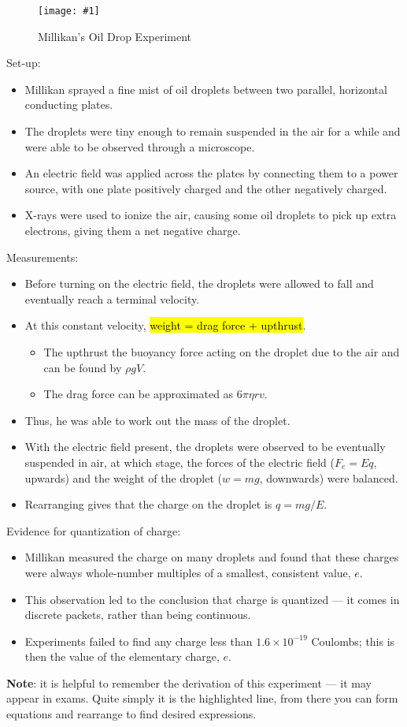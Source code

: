 \documentclass[a4paper,12pt]{article}
\newcommand{\img}[4]{\begin{center}
  \begin{figure}[H]
    \centering
    \texttt{[image: \#1]}
    \caption{#3}
    \label{fig:#4}
  \end{figure}
\end{center}}
\begin{document}
\img{oildrop.jpg}{0.7}{Millikan's Oil Drop Experiment}{oildrop}
Set-up:
\begin{itemize}
  \item Millikan sprayed a fine mist of oil droplets between two parallel, horizontal conducting plates.
  \item  The droplets were tiny enough to remain suspended in the air for a while and were able to be observed through a microscope.
  \item An electric field was applied across the plates by connecting them to a power source, with one plate positively charged and the other negatively charged.
  \item X-rays were used to ionize the air, causing some oil droplets to pick up extra electrons, giving them a net negative charge.
\end{itemize}
Measurements:
\begin{itemize}
  \item Before turning on the electric field, the droplets were allowed to fall and eventually reach a terminal velocity.
  \item At this constant velocity, \hl{weight = drag force + upthrust}.
        \begin{itemize}
          \item The upthrust the buoyancy force acting on the droplet due to the air and can be found by $\rho gV$.
          \item The drag force can be approximated as $6\pi\eta rv$.
        \end{itemize}
  \item Thus, he was able to work out the mass of the droplet.
  \item With the electric field present, the droplets were observed to be eventually suspended in air, at which stage, the forces of the electric field ($F_e = Eq$, upwards) and the weight of the droplet ($w = mg$, downwards) were balanced.
  \item Rearranging gives that the charge on the droplet is $q = mg/E$.
\end{itemize}
Evidence for quantization of charge:
\begin{itemize}
  \item Millikan measured the charge on many droplets and found that these charges were always whole-number multiples of a smallest, consistent value, $e$.
  \item This observation led to the conclusion that charge is quantized --- it comes in discrete packets, rather than being continuous.
  \item Experiments failed to find any charge less than $1.6 \times 10^{-19}$ Coulombs; this is then the value of the elementary charge, $e$.
\end{itemize}
\textbf{Note}: it is helpful to remember the derivation of this experiment --- it may appear in exams. Quite simply it is the highlighted line, from there you can form equations and rearrange to find desired expressions.
\end{document}
